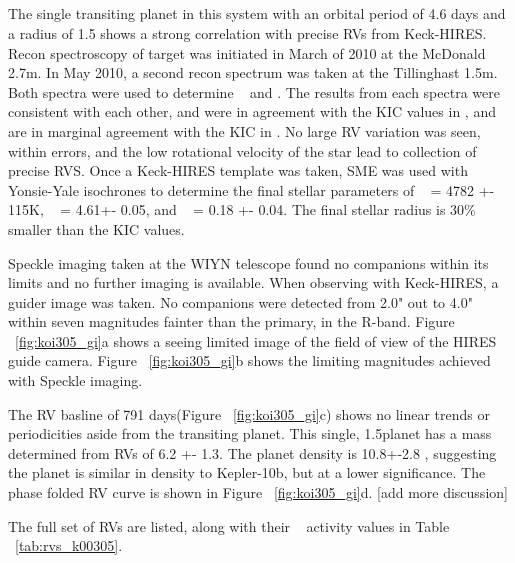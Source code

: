 \documentclass{emulateapj}
\begin{document}
\subsection{\koithreezerofive}  %

The single transiting planet in this system with an orbital period of 4.6 days and a radius of 1.5 \rearth shows a strong correlation with precise RVs from Keck-HIRES. Recon spectroscopy of target was initiated in March of 2010 at the McDonald 2.7m. In May 2010, a second recon spectrum was taken at the Tillinghast 1.5m. Both spectra were used to determine \teff~ and \logg. The results from each spectra were consistent with each other, and were in agreement with the KIC values in \teff, and are in marginal agreement with the KIC in  \logg. No large RV variation was seen, within errors, and the low rotational velocity of the star lead to collection of precise RVS. Once a Keck-HIRES template was taken, SME was used with Yonsie-Yale isochrones to determine the final stellar parameters of \teff~ = 4782 +- 115K, \logg~ = 4.61+- 0.05, and \feh~ = 0.18 +- 0.04.  The final stellar radius is 30\% smaller than the KIC values. 

Speckle imaging taken at the WIYN telescope found no companions within its limits and no further imaging is available. When observing with Keck-HIRES, a guider image was taken. No companions were detected from 2.0" out to 4.0" within seven magnitudes fainter than the primary, in the R-band. Figure ~\ref{fig:koi305_gi}a shows a seeing limited image of the field of view of the HIRES guide camera.  Figure ~\ref{fig:koi305_gi}b shows the limiting magnitudes achieved with Speckle imaging.


The RV basline of 791 days(Figure ~\ref{fig:koi305_gi}c) shows no linear trends or periodicities aside from the transiting planet. This single, 1.5\rearth  planet has a mass determined from RVs of 6.2 +- 1.3\mearthe.  The planet density is 10.8+-2.8 \gcc, suggesting the planet is similar in density to Kepler-10b, but at a lower significance. The phase folded RV curve is shown in Figure ~\ref{fig:koi305_gi}d. [add more discussion]

The full set of RVs are listed, along with their \rphk~ activity values in Table ~\ref{tab:rvs_k00305}.


\subsection{\koithreetwoone}  %
\end{document}
